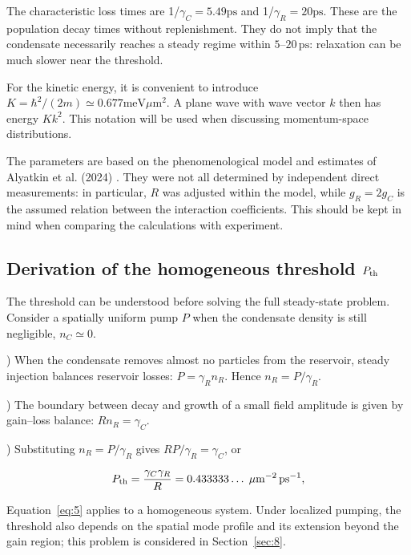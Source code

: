\documentclass[12pt,a4paper]{article}
\begin{document}
The characteristic loss times are 1/$\gamma_{C}=5.49 \mathrm{ps}$ and 1/$\gamma_{R}=20 \mathrm{ps}$. These are the population decay times without replenishment. They do not imply that the condensate necessarily reaches a steady regime within $5\text{--}20\,\mathrm{ps}$: relaxation can be much slower near the threshold.

For the kinetic energy, it is convenient to introduce $K=\hbar^{2}/(2m)\simeq0.677 \mathrm{meV} \mu\mathrm m^{2}$. A plane wave with wave vector $k$ then has energy $K k^{2}$. This notation will be used when discussing momentum-space distributions.

The parameters are based on the phenomenological model and estimates of Alyatkin et al. (2024) \cite{ref3}. They were not all determined by independent direct measurements: in particular, $R$ was adjusted within the model, while $g_{R}=2g_{C}$ is the assumed relation between the interaction coefficients. This should be kept in mind when comparing the calculations with experiment.

\subsection{Derivation of the homogeneous threshold \texorpdfstring{$P_{\rm th}$}{Pth}}\label{sec:2.5}

The threshold can be understood before solving the full steady-state problem. Consider a spatially uniform pump $P$ when the condensate density is still negligible, $n_{C}\simeq0$.

) When the condensate removes almost no particles from the reservoir, steady injection balances reservoir losses: $P=\gamma_{R} n_{R}$. Hence $n_{R}=P/\gamma_{R}$.

) The boundary between decay and growth of a small field amplitude is given by gain--loss balance: $R n_{R}=\gamma_{C}$.

) Substituting $n_{R}=P/\gamma_{R}$ gives $R P/\gamma_{R}=\gamma_{C}$, or

\begin{equation}\label{eq:5}
P_{\rm th}=\frac{\gamma_C\gamma_R}{R}=0.433333\ldots\;\mu\mathrm m^{-2}\,\mathrm{ps}^{-1},\end{equation}

Equation~\eqref{eq:5} applies to a homogeneous system. Under localized pumping, the threshold also depends on the spatial mode profile and its extension beyond the gain region; this problem is considered in Section~\ref{sec:8}.
\end{document}
